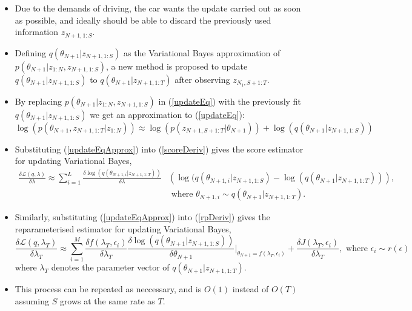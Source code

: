 \documentclass[12pt,a4paper]{article}\usepackage[]{graphicx}\usepackage[]{color}
\begin{document}
\begin{itemize}
\item Due to the demands of driving, the car wants the update carried out as soon as possible, and ideally should be able to discard the previously used information $z_{N+1, 1:S}$. 
\item Defining $q(\theta_{N+1} | z_{N+1, 1:S})$ as the Variational Bayes approximation of $p(\theta_{N+1} | z_{1:N}, z_{N+1, 1:S})$, a new method is proposed to update $q(\theta_{N+1} | z_{N+1, 1:S})$ to $q(\theta_{N+1} | z_{N+1, 1:T})$ after observing $z_{N_1, S+1:T}$.
\item By replacing $p(\theta_{N+1} | z_{1:N}, z_{N+1, 1:S})$ in (\ref{updateEq}) with the previously fit $q(\theta_{N+1} | z_{N+1, 1:S})$ we get an approximation to (\ref{updateEq}):
\begin{equation}
\label{updateEqApprox}
\log(p(\theta_{N+1}, z_{N+1, 1:T} | z_{1:N})) \approx \log(p(z_{N+1, S+1:T} | \theta_{N+1})) + \log(q(\theta_{N+1} | z_{N+1, 1:S}))
\end{equation}
\item Substituting (\ref{updateEqApprox}) into (\ref{scoreDeriv}) gives the score estimator for updating Variational Bayes, 
\begin{align}
\label{scoreUpdate}
\frac{\delta\mathcal{L}(q, \lambda)}{\delta \lambda} \approx \sum_{i = 1}^L \frac{\delta \log(q(\theta_{N+1, i} | z_{N+1, 1:T}))}{\delta \lambda} &\left(\log(q(\theta_{N+1, i} | z_{N+1, 1:S}) - \log(q(\theta_{N+1} | z_{N+1, 1:T})) \right), \nonumber \\
& \mbox{ where } \theta_{N+1, i} \sim q(\theta_{N+1} | z_{N+1, 1:T}).
\end{align}
\item Similarly, substituting (\ref{updateEqApprox}) into (\ref{rpDeriv}) gives the reparameterised estimator for updating Variational Bayes,
\begin{equation}
\label{rpUpdate}
\frac{\delta\mathcal{L}(q, \lambda_T)}{\delta \lambda_T} \approx \sum_{i = 1}^M \frac{\delta f(\lambda_T, \epsilon_i)}{\delta \lambda_T} \frac{\delta \log(q(\theta_{N+1} | z_{N+1, 1:S}))}{\delta \theta_{N+1}} \bigg\rvert_{\theta_{N+1} = f(\lambda_T, \epsilon_i)} + \frac{\delta J(\lambda_T, \epsilon_i)}{\delta \lambda_T}, \mbox{ where } \epsilon_i \sim r(\epsilon)
\end{equation}
where $\lambda_T$ denotes the parameter vector of $q(\theta_{N+1} | z_{N+1, 1:T})$.
\item This process can be repeated as neccessary, and is $O(1)$ instead of $O(T)$ assuming $S$ grows at the same rate as $T$.
\end{itemize}
\end{document}

